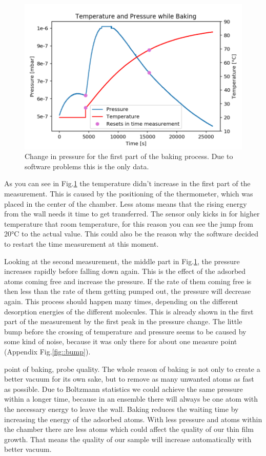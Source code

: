 \documentclass[]{article}
\begin{document}
\begin{figure}[h]
\centering\includegraphics[width=.75\textwidth]{Plots/Baking.png}
\caption{Change in pressure for the first part of the baking process. Due to software problems this is the only data.}
\label{fig::baking}
\end{figure}

As you can see in Fig.\ref{fig::baking} the temperature didn't increase in the first part of the measurement. This is caused by the positioning of the thermometer, which was placed in the center of the chamber. Less atoms means that the rising energy from the wall needs it time to get transferred. 
The sensor only kicks in for higher temperature that room temperature, for this reason you can see the jump from 20°C to the actual value. This could also be the reason why the software decided to restart the time measurement at this moment. 

Looking at the second measurement, the middle part in Fig.\ref{fig::baking}, the pressure increases rapidly before falling down again. This is the effect of the adsorbed atoms coming free and increase the pressure. If the rate of them coming free is then less than the rate of them getting pumped out, the pressure will decrease again. This process should happen many times, depending on the different desorption energies of the different molecules. 
This is already shown in the first part of the measurement by the first peak in the pressure change. The little bump before the crossing of temperature and pressure seems to be caused by some kind of noise, because it was only there for about one measure point (Appendix Fig.\ref{fig::bump}).

point of baking, probe quality. The whole reason of baking is not only to create a better vacuum for its own sake, but to remove as many unwanted atoms as fast as possible. Due to Boltzmann statistics we could achieve the same pressure within a longer time, because in an ensemble there will always be one atom with the necessary energy to leave the wall. Baking reduces the waiting time by increasing the energy of the adsorbed atoms.
With less pressure and atoms within the chamber there are less atoms which could affect the quality of our thin film growth. That means the quality of our sample will increase automatically with better vacuum.
\end{document}
